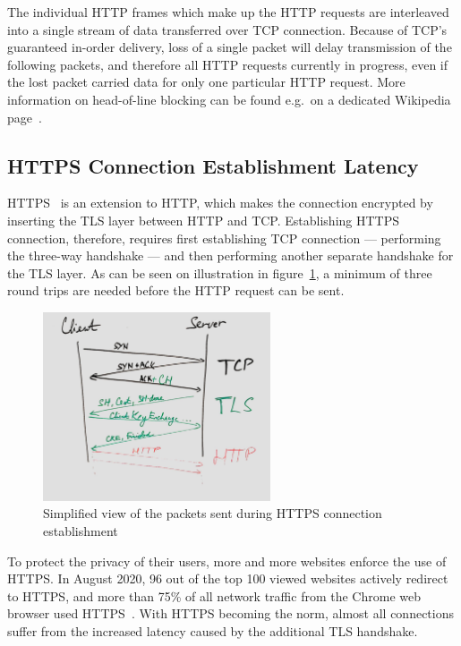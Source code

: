 The individual HTTP frames which make up the HTTP requests are interleaved into a single stream of
data transferred over TCP connection. Because of TCP's guaranteed in-order delivery, loss of a
single packet will delay transmission of the following packets, and therefore all HTTP requests
currently in progress, even if the lost packet carried data for only one particular HTTP request.
More information on head-of-line blocking can be found e.g.\ on a dedicated Wikipedia
page~\cite{wiki:head-of-line_blocking}.

\subsection*{HTTPS Connection Establishment Latency}
HTTPS~\cite{rfc2818} is an extension to HTTP, which makes the connection encrypted by inserting the
TLS layer between HTTP and TCP\@. Establishing HTTPS connection, therefore, requires first
establishing TCP connection --- performing the three-way handshake --- and then performing another
separate handshake for the TLS layer. As can be seen on illustration in
figure~\ref{fig:https-packets}, a minimum of three round trips are needed before the HTTP request
can be sent.

\begin{figure}[h]
  \centering
  \includegraphics[width=0.6\textwidth]{img/01-https-connection-packets}
  \caption{Simplified view of the packets sent during HTTPS connection establishment}\label{fig:https-packets}
\end{figure}

To protect the privacy of their users, more and more websites enforce the use of HTTPS\@.
In August 2020, 96 out of the top 100 viewed websites actively redirect to HTTPS, and more than 75\%
of all network traffic from the Chrome web browser used HTTPS~\cite{googleTransparency}. With HTTPS
becoming the norm, almost all connections suffer from the increased latency caused by the
additional TLS handshake.

